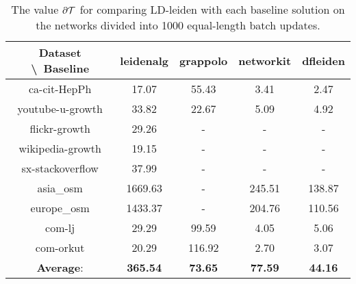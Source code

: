 \begin{table}[H]
	\centering
	\begin{tabular}{|c|c|c|c|c|}
		\hline
		Dataset \textbackslash\ Baseline & leidenalg & grappolo & networkit & dfleiden \\
		\hline
		ca-cit-HepPh & 17.07 & 55.43 & 3.41 & 2.47 \\
		\hline
		youtube-u-growth & 33.82 & 22.67 & 5.09 & 4.92 \\
		\hline
		flickr-growth & 29.26 & - & - & - \\
		\hline
		wikipedia-growth & 19.15 & - & - & - \\
		\hline
		sx-stackoverflow & 37.99 & - & - & - \\
		\hline
		asia\_osm & 1669.63 & - & 245.51 & 138.87 \\
		\hline
		europe\_osm & 1433.37 & - & 204.76 & 110.56 \\
		\hline
		com-lj & 29.29 & 99.59 & 4.05 & 5.06 \\
		\hline
		com-orkut & 20.29 & 116.92 & 2.70 & 3.07 \\
		\hline
		\textbf{Average}: & \textbf{365.54} & \textbf{73.65} & \textbf{77.59} & \textbf{44.16} \\
		\hline
	\end{tabular}
\caption{The value $\partial\mathcal{T}$ for comparing LD-leiden with each baseline solution on the networks divided into 1000 equal-length batch updates.}
\label{T:ameanT:1000 batches}
\end{table}